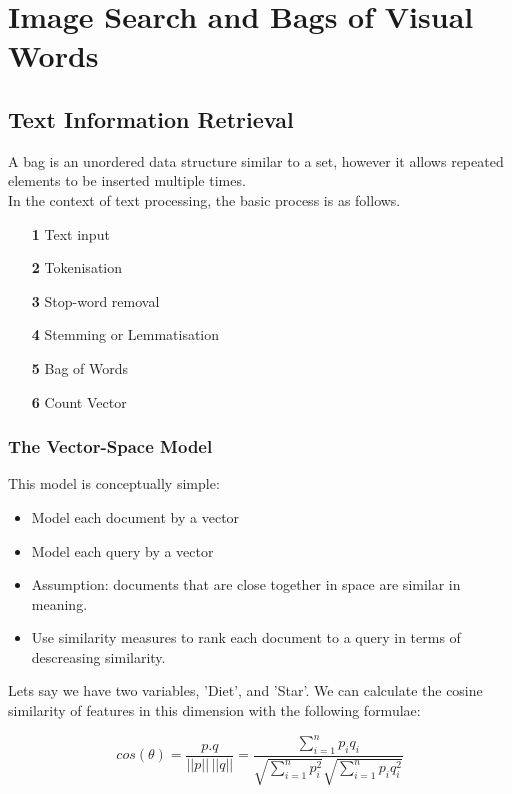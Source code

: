 \section{Image Search and Bags of Visual Words}

\subsection{Text Information Retrieval}

A bag is an unordered data structure similar to a set, however it allows repeated elements to be inserted multiple times. \\

\noindent In the context of text processing, the basic process is as follows.

\begin{itemize}
    \itemsep0em
    \item [\textbf{1}] Text input
    \item [\textbf{2}] Tokenisation
    \item [\textbf{3}] Stop-word removal
    \item [\textbf{4}] Stemming or Lemmatisation
    \item [\textbf{5}] Bag of Words
    \item [\textbf{6}] Count Vector
\end{itemize}

\subsubsection{The Vector-Space Model}

This model is conceptually simple:

\begin{itemize}
    \itemsep0em
    \item Model each document by a vector
    \item Model each query by a vector
    \item Assumption: documents that are close together in space are similar in meaning.
    \item Use similarity measures to rank each document to a query in terms of descreasing similarity.
\end{itemize}

\noindent Lets say we have two variables, 'Diet', and 'Star'. We can calculate the cosine similarity of features in this dimension with the following formulae:

\begin{equation}
    cos(\theta) = \frac{p.q}{||p||\, ||q||} = \frac{\sum_{i=1}^{n}p_{i}q_{i}}{ \sqrt{ \sum_{i=1}^{n}p_{i}^2 } \sqrt{ \sum_{i=1}^{n}p_{i}q_{i}^2}}
\end{equation}

